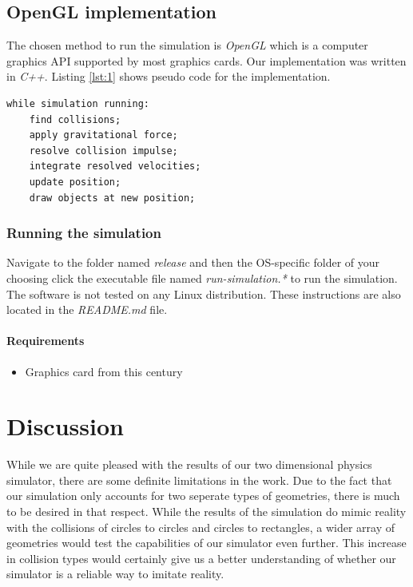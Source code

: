 \documentclass[a4paper,12pt]{report}
\begin{document}
\section{OpenGL implementation}
\label{sec:opengl}

The chosen method to run the simulation is \emph{OpenGL} which is a computer graphics API supported by most graphics cards. Our implementation was written in \emph{C++}. Listing \ref{lst:1} shows pseudo code for the implementation.

\begin{lstlisting}[caption={Pseudo code for the simulation loop.}, label=lst:1]
while simulation running:
    find collisions;
    apply gravitational force;
    resolve collision impulse;
    integrate resolved velocities;
    update position;
    draw objects at new position;
\end{lstlisting}


\subsection{Running the simulation}

Navigate to the folder named \emph{release} and then the OS-specific folder of your choosing click the executable file named \emph{run-simulation.*} to run the simulation. The software is not tested on any Linux distribution. These instructions are also located in the \emph{README.md} file.

\subsubsection{Requirements}
\begin{itemize}
    \item Graphics card from this century
\end{itemize}


\chapter{Discussion}

While we are quite pleased with the results of our two dimensional physics simulator, there are some definite limitations in the work. Due to the fact that our simulation only accounts for two seperate types of geometries, there is much to be desired in that respect. While the results of the simulation do mimic reality with the collisions of circles to circles and circles to rectangles, a wider array of geometries would test the capabilities of our simulator even further. This increase in collision types would certainly give us a better understanding of whether our simulator is a reliable way to imitate reality.
\end{document}
